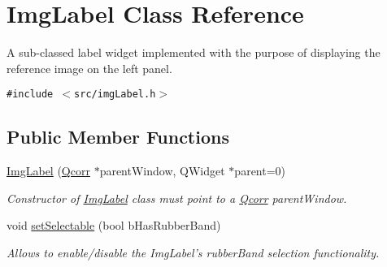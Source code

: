 \hypertarget{classImgLabel}{
\section{ImgLabel Class Reference}
\label{classImgLabel}
}
A sub-classed label widget implemented with the purpose of displaying the reference image on the left panel.  


{\tt \#include $<$src/imgLabel.h$>$}

\subsection*{Public Member Functions}
\begin{CompactItemize}
\item 
\hypertarget{classImgLabel_69e37830ecfccbd824166d03fc9c248d}{
\hyperlink{classImgLabel_69e37830ecfccbd824166d03fc9c248d}{ImgLabel} (\hyperlink{classQcorr}{Qcorr} $\ast$parentWindow, QWidget $\ast$parent=0)}
\label{classImgLabel_69e37830ecfccbd824166d03fc9c248d}

\begin{CompactList}\small\item\em Constructor of \hyperlink{classImgLabel}{ImgLabel} class must point to a \hyperlink{classQcorr}{Qcorr} parentWindow. \item\end{CompactList}\item 
void \hyperlink{classImgLabel_3e5988fc63515a300e69593c9236e126}{setSelectable} (bool bHasRubberBand)
\begin{CompactList}\small\item\em Allows to enable/disable the ImgLabel's rubberBand selection functionality. \item\end{CompactList}\end{CompactItemize}
